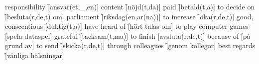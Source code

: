 \begin{questions}
\begin{multicols}{2}
        \question responsibility \f[ansvar(et,\_,en)]
        \question content \f[nöjd(t,da)]
        \question paid \f[betald(t,a)]
        \question to decide on \f[besluta(r,de,t) om]
        \question parliament \f[riksdag(en,ar(na))]
        \question to increase \f[öka(r,de,t)]
        \question good, conscentious \f[duktig(t,a)]
        \question have heard of \f[hört talas om]
        \question to play computer games \f[spela dataspel]
        \question grateful \f[tacksam(t,ma)]
        \question to finish \f[avsluta(r,de,t)]
        \question because of \f[på grund av]
        \question to send \f[skicka(r,de,t)]
        \question through colleagues \f[genom kollegor]
        \question best regards \f[vänliga hälsningar]
    \end{multicols}
\end{questions}
